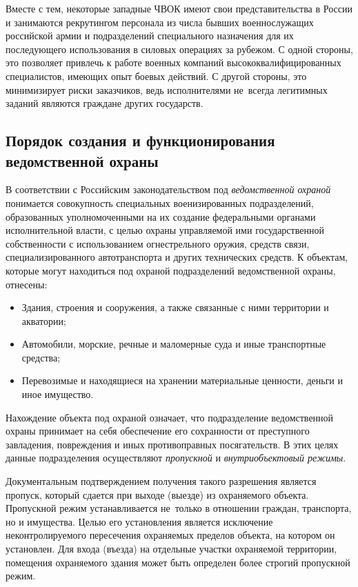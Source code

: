\documentclass[a4paper,12pt,fleqn]{article} %
\begin{document}
Вместе с тем, некоторые западные ЧВОК имеют свои представительства в России и занимаются рекрутингом персонала из числа бывших военнослужащих российской армии и подразделений специального назначения для их последующего использования в силовых операциях за рубежом. С одной стороны, это позволяет привлечь к работе военных компаний высококвалифицированных специалистов, имеющих опыт боевых действий. С другой стороны, это минимизирует риски заказчиков, ведь исполнителями не~всегда легитимных заданий являются граждане других государств.

\subsection{Порядок создания и функционирования ведомственной охраны}

В соответствии с Российским законодательством под \textit{ведомственной охраной} понимается совокупность специальных военизированных подразделений, образованных уполномоченными на их создание федеральными органами исполнительной власти, с целью охраны управляемой ими государственной собственности с использованием огнестрельного оружия, средств связи, специализированного автотранспорта и других технических средств. К объектам, которые могут находиться под охраной подразделений ведомственной охраны, отнесены:

\begin{itemize}
	\item Здания, строения и сооружения, а также связанные с ними территории и акватории;
	\item Автомобили, морские, речные и маломерные суда и иные транспортные средства;
	\item Перевозимые и находящиеся на хранении материальные ценности, деньги и иное имущество.
\end{itemize}

Нахождение объекта под охраной означает, что подразделение ведомственной охраны принимает на себя обеспечение его сохранности от преступного завладения, повреждения и иных противоправных посягательств. В этих целях данные подразделения осуществляют \textit{пропускной} и \textit{внутриобъектовый режимы}.\\


Документальным подтверждением получения такого разрешения является пропуск, который сдается при выходе (выезде) из охраняемого объекта. Пропускной режим устанавливается не~только в отношении граждан, транспорта, но и имущества. Целью его установления является исключение неконтролируемого пересечения охраняемых пределов объекта, на котором он установлен. Для входа (въезда) на отдельные участки охраняемой территории, помещения охраняемого здания может быть определен более строгий пропускной режим. \\
\end{document}
